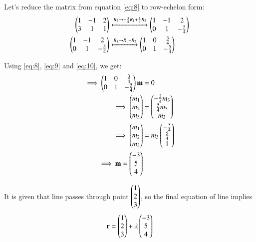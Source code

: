 \documentclass[journal,12pt,twocolumn]{IEEEtran}
\renewcommand{\vec}[1]{\boldsymbol{\mathbf{#1}}}
\begin{document}
Let's reduce the matrix from equation \eqref{eq:8} to row-echelon form:
\begin{align}
    \label{eq:9} \begin{pmatrix}1&-1&2 \\ 3&1&1\end{pmatrix} &\xleftrightarrow[]{R_2\rightarrow -\frac{3}{4}{R_1} + \frac{1}{4}{R_2}} \begin{pmatrix}1&-1&2 \\ 0&1&-\frac{5}{4}\end{pmatrix}\\
    \label{eq:10} \begin{pmatrix}1&-1&2 \\ 0&1&-\frac{5}{4}\end{pmatrix} &\xleftrightarrow[]{R_1\rightarrow {R_1} + {R_2}} \begin{pmatrix}1&0&\frac{3}{4} \\ 0&1&-\frac{5}{4}\end{pmatrix}
\end{align}

Using \eqref{eq:8}, \eqref{eq:9} and \eqref{eq:10}, we get:
\begin{align}
    \implies \myvec{1&0&\frac{3}{4} \\ 0&1&-\frac{5}{4}}\vec{m} &= 0 \\
    \implies \myvec{{m}_1\\{m}_2\\{m}_3} &= \myvec{-\frac{3}{4}{m}_3\\\frac{5}{4}{m}_3\\{m}_3} \\
    \implies \myvec{{m}_1\\{m}_2\\{m}_3} &= {m}_3\myvec{-\frac{3}{4}\\\frac{5}{4}\\1} \\
    \implies \vec{m} = \myvec{-3\\5\\4}
\end{align}

It is given that line passes through point $\begin{pmatrix}1\\2\\3\end{pmatrix}$, so the final equation of line implies
\begin{align}
    \vec{r} = \myvec{1\\2\\3} + \lambda\myvec{-3\\5\\4} \\
\end{align}
\end{document}
